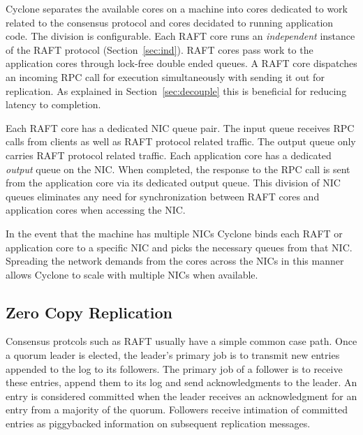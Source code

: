 \documentclass[twocolumn]{article}
\begin{document}
Cyclone separates the available cores on a machine into cores dedicated to work
related to the consensus protocol and cores decidated to running application
code. The division is configurable. Each RAFT core runs an \emph{independent}
instance of the RAFT protocol (Section~\ref{sec:ind}). RAFT cores pass work to
the application cores through lock-free double ended queues. A RAFT core
dispatches an incoming RPC call for execution simultaneously with sending it out
for replication. As explained in Section~\ref{sec:decouple} this is beneficial
for reducing latency to completion. 

Each RAFT core has a dedicated NIC queue pair. The input queue receives RPC
calls from clients as well as RAFT protocol related traffic. The output queue
only carries RAFT protocol related traffic. Each application core has a
dedicated \emph{output} queue on the NIC. When completed, the response to the
RPC call is sent from the application core via its dedicated output queue. This
division of NIC queues eliminates any need for synchronization between RAFT
cores and application cores when accessing the NIC.

In the event that the machine has multiple NICs Cyclone binds each RAFT or
application core to a specific NIC and picks the necessary queues from that
NIC. Spreading the network demands from the cores across the NICs in this manner
allows Cyclone to scale with multiple NICs when available.

\subsection{Zero Copy Replication}
Consensus protcols such as RAFT usually have a simple common case path. Once a
quorum leader is elected, the leader's primary job is to transmit new entries
appended to the log to its followers. The primary job of a follower is to
receive these entries, append them to its log and send acknowledgments to the
leader. An entry is considered committed when the leader receives an
acknowledgment for an entry from a majority of the quorum. Followers receive
intimation of committed entries as piggybacked information on subsequent
replication messages.
\end{document}

